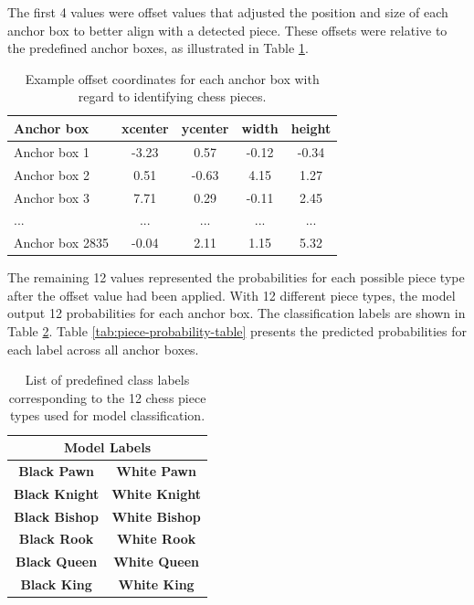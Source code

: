The first 4 values were offset values that adjusted the position and size of each anchor box to better align with a detected piece. These offsets were relative to the predefined anchor boxes, as illustrated in Table \ref{tab:piece-offset-table}.

\begin{table}[h]
    \centering
    \caption[Example offset values for anchor boxes, chess pieces]{Example offset coordinates for each anchor box with regard to identifying chess pieces.}  %
    \renewcommand{\arraystretch}{1.3} %
    \begin{tabular}{lcccc}
        \toprule
        \textbf{Anchor box} & \textbf{xcenter} & \textbf{ycenter} & \textbf{width} & \textbf{height} \\
        \midrule
        Anchor box 1 & -3.23 & 0.57 & -0.12 & -0.34 \\
        Anchor box 2 & 0.51 & -0.63 & 4.15 & 1.27 \\
        Anchor box 3 & 7.71 & 0.29 & -0.11 & 2.45 \\
        ... & ... & ... & ... & ... \\
        Anchor box 2835 & -0.04 & 2.11 & 1.15 & 5.32 \\
        \bottomrule
    \end{tabular}
    \label{tab:piece-offset-table}
\end{table}


The remaining 12 values represented the probabilities for each possible piece type after the offset value had been applied. With 12 different piece types, the model output 12 probabilities for each anchor box. The classification labels are shown in Table \ref{tab:piece-label-table}. Table \ref{tab:piece-probability-table} presents the predicted probabilities for each label across all anchor boxes. \\


\begin{table}[ht]
\renewcommand{\arraystretch}{1.1}  %
\centering
\caption[Labels for chess piece types]{List of predefined class labels corresponding to the 12 chess piece types used for model classification.}
\begin{tabular}{|c|c|}
\hline
\multicolumn{2}{|c|}{\textbf{Model Labels}} \\  
\hline
\textbf{Black Pawn} & \textbf{White Pawn} \\
\textbf{Black Knight} & \textbf{White Knight} \\
\textbf{Black Bishop} & \textbf{White Bishop} \\
\textbf{Black Rook} & \textbf{White Rook} \\
\textbf{Black Queen} & \textbf{White Queen} \\
\textbf{Black King} & \textbf{White King} \\
\hline
\end{tabular}
\label{tab:piece-label-table}
\end{table}


